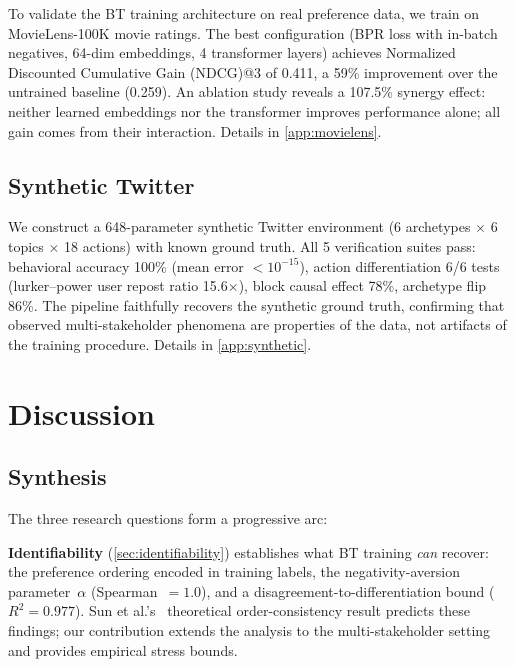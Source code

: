 \documentclass[11pt,letterpaper]{article}
\begin{document}
To validate the BT training architecture on real preference data, we
train on MovieLens-100K movie ratings. The best configuration (BPR
loss with in-batch negatives, 64-dim embeddings, 4 transformer
layers) achieves Normalized Discounted Cumulative Gain (NDCG)@3 of
0.411, a 59\% improvement over the untrained baseline (0.259). An
ablation study reveals a 107.5\% synergy effect: neither learned
embeddings nor the transformer improves performance alone; all gain
comes from their interaction. Details in \cref{app:movielens}.

\subsection{Synthetic Twitter}

We construct a 648-parameter synthetic Twitter environment (6
archetypes $\times$ 6 topics $\times$ 18 actions) with known ground
truth. All 5 verification suites pass: behavioral accuracy 100\%
(mean error $< 10^{-15}$), action differentiation 6/6 tests
(lurker--power user repost ratio 15.6$\times$), block causal effect
78\%, archetype flip 86\%. The pipeline faithfully recovers the
synthetic ground truth, confirming that observed multi-stakeholder
phenomena are properties of the data, not artifacts of the
training procedure. Details in \cref{app:synthetic}.

\section{Discussion}
\label{sec:discussion}

\subsection{Synthesis}

The three research questions form a progressive arc:

\textbf{Identifiability} (\cref{sec:identifiability}) establishes what BT training
\emph{can} recover: the preference ordering encoded in training labels,
the negativity-aversion parameter~$\alpha$ (Spearman~$= 1.0$), and a
disagreement-to-differentiation bound ($R^2 = 0.977$). Sun
et al.'s~\cite{sun2025rethinking} theoretical order-consistency result
predicts these findings; our contribution extends the
analysis to the multi-stakeholder setting and provides empirical stress
bounds.
\end{document}
